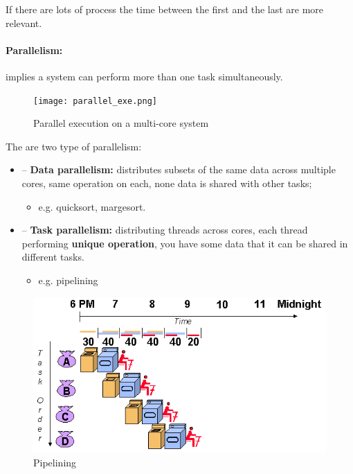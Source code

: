 If there are lots of process the time between the first and the last are more relevant.
\paragraph{}

\paragraph{Parallelism: } implies a system can perform more than one task simultaneously.

\begin{figure}[htbp]
    \centering
    \texttt{[image: parallel\_exe.png]}
    \caption{Parallel execution on a multi-core system}    
\end{figure}

The are two type of parallelism:

\begin{itemize}
    \item -- \textbf{Data parallelism:} distributes subsets of the same data
across multiple cores, same operation on each, none data is shared with other tasks;
        \begin{itemize}
            \item[] e.g. quicksort, margesort.
        \end{itemize}
    \item -- \textbf{Task parallelism:} distributing threads across cores, each
thread performing \textbf{unique operation}, you have some data that it can be shared in different tasks.
        \begin{itemize}
            \item[] e.g. pipelining
        \end{itemize}
\end{itemize}

\begin{figure}[htbp]
    \centering
    \includegraphics[width=0.65\linewidth]{img/pipeling.png}
    \caption{Pipelining}    
\end{figure}

